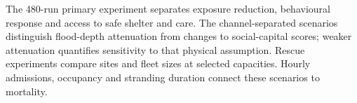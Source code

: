 The 480-run primary experiment separates exposure reduction, behavioural response and access to safe shelter and care. The channel-separated scenarios distinguish flood-depth attenuation from changes to social-capital scores; weaker attenuation quantifies sensitivity to that physical assumption. Rescue experiments compare sites and fleet sizes at selected capacities. Hourly admissions, occupancy and stranding duration connect these scenarios to mortality.
